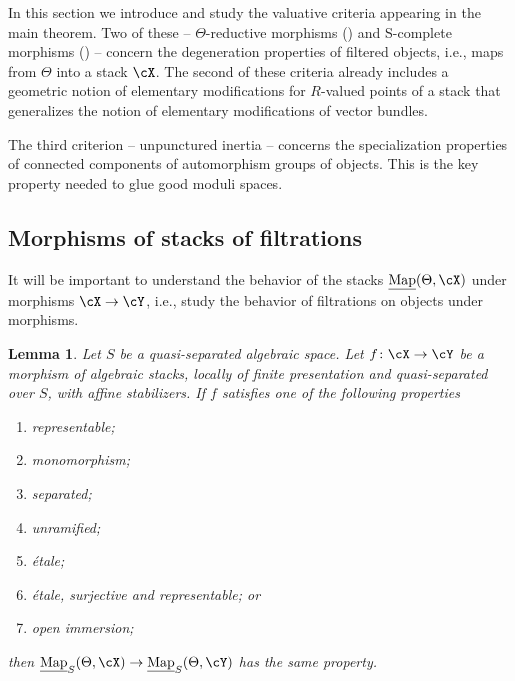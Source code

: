 \documentclass[a4paper]{amsart}
\numberwithin{equation}{section}
\theoremstyle{plain}
\newtheorem{lem}[thm]{Lemma}
\theoremstyle{definition}
\newcommand{\uMap}{\underline{{\rm Map}}}
\newcommand{\co}{\colon}
\begin{document}
In this section we introduce and study the valuative criteria appearing in the main theorem.  Two of these -- $\Theta$-reductive morphisms () and {\textsf{S}}-complete morphisms () -- concern the degeneration properties of filtered objects, i.e., maps from $\Theta$ into a stack $\cX$. The second of these criteria already includes a geometric notion of elementary modifications for $R$-valued points of a stack that generalizes the notion of elementary modifications of vector bundles. 
	
The third criterion -- unpunctured inertia -- concerns the specialization properties of connected components of automorphism groups of objects. This is the key property needed to glue good moduli spaces.


\subsection{Morphisms of stacks of filtrations}
It will be important to understand the behavior of the stacks $\uMap(\Theta,\cX)$ under morphisms $\cX \to \cY$, i.e., study the behavior of filtrations on objects under morphisms.

\begin{lem} \label{L:theta-morphism} Let $S$ be a quasi-separated algebraic space.
	Let $f \co \cX \to \cY$ be a morphism of algebraic stacks, locally of finite presentation and quasi-separated over $S$, with affine stabilizers.  If $f$ satisfies one of the following properties
	\begin{enumerate}[label=(\alph*)]
		\item representable; 
		\label{L:theta-morphism-representable}
		\item monomorphism; 
		\label{L:theta-morphism-monomorphism}
		\item separated; 
		\label{L:theta-morphism-separated}
		\item unramified; 
		\label{L:theta-morphism-unramifed}
		\item \'etale;
		\label{L:theta-morphism-etale}
		\item  \'etale, surjective and representable; or
		\label{L:theta-morphism-representable-etale-surjective}
		\item {open immersion};
		\label{L:theta-morphism-open}
	\end{enumerate}
	then  $\uMap_S(\Theta,\cX) \to \uMap_S(\Theta,\cY)$ has the same property.
\end{lem}	 
\end{document}
